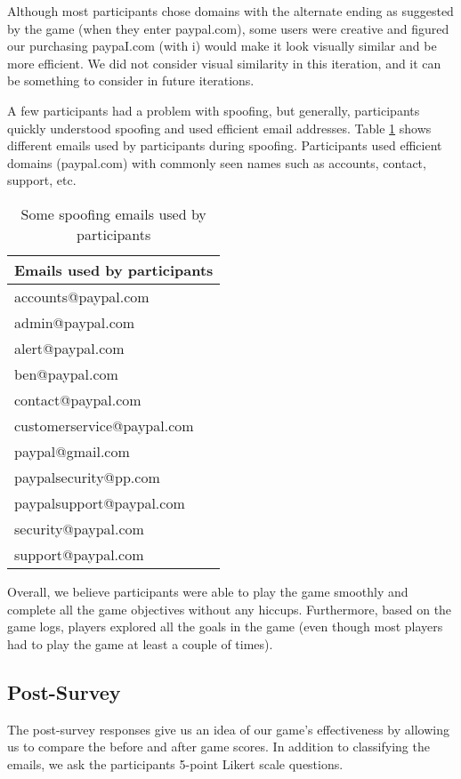 Although most participants chose domains with the alternate ending as suggested by the game (when they enter paypal.com), some users were creative and figured our purchasing paypaI.com (with i) would make it look visually similar and be more efficient. We did not consider visual similarity in this iteration, and it can be something to consider in future iterations.

A few participants had a problem with spoofing, but generally, participants quickly understood spoofing and used efficient email addresses. Table \ref{tab:spoofing_emails} shows different emails used by participants during spoofing. Participants used efficient domains (paypal.com) with commonly seen names such as accounts, contact, support, etc.

\begin{table}
    \centering
    \begin{tabular}{l}
        \hline
        \textbf{Emails used by participants} \\
        \hline
        accounts@paypal.com                  \\
        admin@paypal.com                     \\
        alert@paypal.com                     \\
        ben@paypal.com                       \\
        contact@paypal.com                   \\
        customerservice@paypal.com           \\
        paypal@gmail.com                     \\
        paypalsecurity@pp.com                \\
        paypalsupport@paypal.com             \\
        security@paypal.com                  \\
        support@paypal.com                   \\
        \hline
    \end{tabular}
    \caption{Some spoofing emails used by participants}
    \label{tab:spoofing_emails}
\end{table}

Overall, we believe participants were able to play the game smoothly and complete all the game objectives without any hiccups. Furthermore, based on the game logs, players explored all the goals in the game (even though most players had to play the game at least a couple of times).

\subsection{Post-Survey}
The post-survey responses give us an idea of our game's effectiveness by allowing us to compare the before and after game scores. In addition to classifying the emails, we ask the participants 5-point Likert scale questions.

